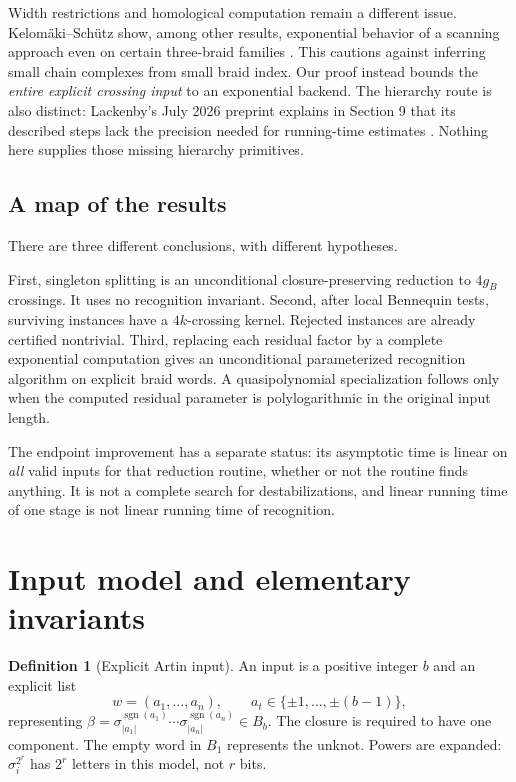 \documentclass[11pt,letterpaper]{article}
\theoremstyle{definition}
\newtheorem{definition}[theorem]{Definition}
\newcommand{\sgn}{\operatorname{sgn}}
\begin{document}
Width restrictions and homological computation remain a different issue. Kelom\"aki--Sch\"utz show, among other results, exponential behavior of a scanning approach even on certain three-braid families \cite{kelomaki}. This cautions against inferring small chain complexes from small braid index. Our proof instead bounds the \emph{entire explicit crossing input} to an exponential backend. The hierarchy route is also distinct: Lackenby's July 2026 preprint explains in Section 9 that its described steps lack the precision needed for running-time estimates \cite{lackenby}. Nothing here supplies those missing hierarchy primitives.

\subsection{A map of the results}
There are three different conclusions, with different hypotheses.

First, singleton splitting is an unconditional closure-preserving reduction to $4g_B$ crossings. It uses no recognition invariant. Second, after local Bennequin tests, surviving instances have a $4k$-crossing kernel. Rejected instances are already certified nontrivial. Third, replacing each residual factor by a complete exponential computation gives an unconditional parameterized recognition algorithm on explicit braid words. A quasipolynomial specialization follows only when the computed residual parameter is polylogarithmic in the original input length.

The endpoint improvement has a separate status: its asymptotic time is linear on \emph{all} valid inputs for that reduction routine, whether or not the routine finds anything. It is not a complete search for destabilizations, and linear running time of one stage is not linear running time of recognition.

\section{Input model and elementary invariants}
\label{sec:model}

\begin{definition}[Explicit Artin input]
An input is a positive integer $b$ and an explicit list
\[
 w=(a_1,\ldots,a_n),\qquad a_t\in\{\pm1,\ldots,\pm(b-1)\},
\]
representing $\beta=\sigma_{|a_1|}^{\sgn(a_1)}\cdots\sigma_{|a_n|}^{\sgn(a_n)}\in B_b$.
The closure is required to have one component. The empty word in $B_1$ represents the unknot. Powers are expanded: $\sigma_i^{2^r}$ has $2^r$ letters in this model, not $r$ bits.
\end{definition}
\end{document}
